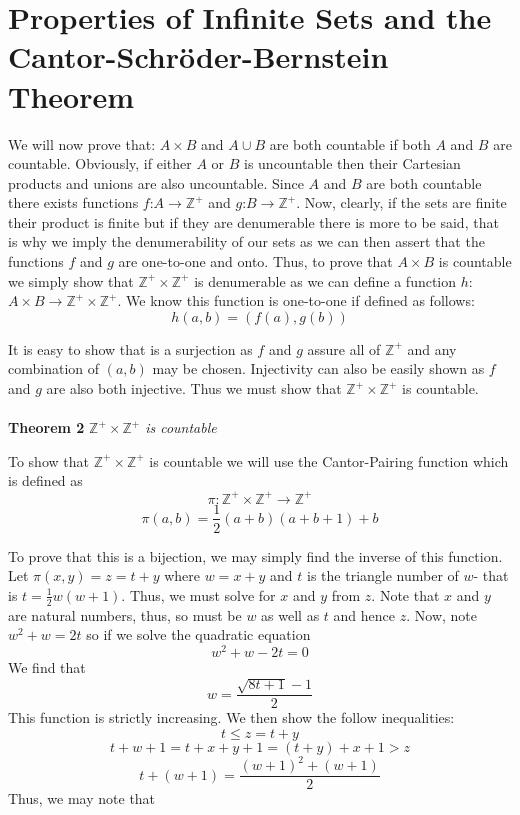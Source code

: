 \documentclass{article}
\begin{document}
\section{Properties of Infinite Sets and the Cantor-Schr\"oder-Bernstein Theorem}
\par We will now prove that: $A \times B$ and $A \cup B$ are both countable if both $A$ and $B$ are countable. Obviously, if either $A$ or $B$ is uncountable then their Cartesian products and unions are also uncountable. Since $A$ and $B$ are both countable there exists functions $f$:$A \to \mathbb{Z}^{+}$ and $g$:$B \to \mathbb{Z}^{+}$. Now, clearly, if the sets are finite their product is finite but if they are denumerable there is more to be said, that is why we imply the denumerability of our sets as we can then assert that the functions $f$ and $g$ are one-to-one and onto. Thus, to prove that $A \times B$ is countable we simply show that $\mathbb{Z}^{+} \times \mathbb{Z}^{+}$ is denumerable as we can define a function $h$:$A \times B \to \mathbb{Z}^{+} \times \mathbb{Z}^{+}$. We know this function is one-to-one if defined as follows: 
\[
h(a,b)=(f(a),g(b))
\]
\par It is easy to show that is a surjection as $f$ and $g$ assure all of $\mathbb{Z}^{+}$ and any combination of $(a,b)$ may be chosen. Injectivity can also be easily shown as $f$ and $g$ are also both injective. Thus we must show that $\mathbb{Z}^{+} \times \mathbb{Z}^{+}$ is countable.
\\
\\
\textbf{Theorem 2}
\textit{$\mathbb{Z}^{+} \times \mathbb{Z}^{+}$ is countable}
\par To show that $\mathbb{Z}^{+} \times \mathbb{Z}^{+}$ is countable we will use the Cantor-Pairing function which is defined as
\[
\pi: \mathbb{Z}^{+} \times \mathbb{Z}^{+} \to \mathbb{Z}^{+}
\]
\[
\pi(a,b)=\frac{1}{2}(a+b)(a+b+1)+b
\]
\par To prove that this is a bijection, we may simply find the inverse of this function.
Let $\pi(x,y)=z=t+y$ where $w=x+y$ and $t$ is the triangle number of $w$- that is $t=\frac{1}{2}w(w+1)$. Thus, we must solve for $x$ and $y$ from $z$. Note that $x$ and $y$ are natural numbers, thus, so must be $w$ as well as $t$ and hence $z$. Now, note $w^2+w=2t$ so if we solve the quadratic equation
\[
w^2+w-2t=0
\]
We find that 
\[
w=\frac{\sqrt{8t+1}-1}{2}
\] 
This function is strictly increasing. We then show the follow inequalities:
\[
t \leq z=t+y
\]
\[
t+w+1=t+x+y+1=(t+y)+x+1 > z
\]
\[
t+(w+1)=\frac{(w+1)^2+(w+1)}{2}
\]
Thus, we may note that 
\end{document}
